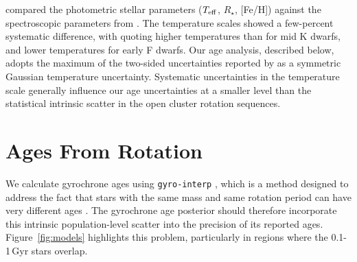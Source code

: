\documentclass[11pt,twocolumn,tighten]{aastex63}
\begin{document}
\citet{David_2021} compared the photometric
 stellar parameters ($T_{\rm eff}$,
$R_\star$, [Fe/H]) against the spectroscopic parameters from
\citet{Fulton_2018}.  The temperature scales showed a few-percent
systematic difference, with  quoting higher
temperatures than  for mid K dwarfs,
and lower temperatures for early F dwarfs.  Our age analysis,
described below, adopts the maximum of the two-sided
uncertainties reported by  as a
symmetric Gaussian temperature uncertainty.  Systematic
uncertainties in the temperature scale generally influence 
our age uncertainties at a
smaller level than the statistical intrinsic scatter in the
open cluster rotation sequences.


\section{Ages From Rotation}
\label{sec:rotage}

\begin{figure*}[!t]
	\begin{center}
		\leavevmode
	\end{center}
	\vspace{-0.6cm}
	\caption{
		{\bf The models.}
    Points represent $10^4$ draws from models that have been fitted to
    rotation periods \citep{Bouma_2023} and lithium equivalent widths
    \citep[EWs;][]{Jeffries_2023} of stars in open clusters.  Lines
    are the ``mean models'' at various ages.  The intrinsic dispersion
    in rotation and lithium about these mean models, which is what the
    models fit, sets the theoretical precision floor for the
    age-dating methods.    Additional sources of uncertainty,
    including measurement uncertainty, impose further limits on
    achievable precision.  These models are calibrated using open
    clusters younger than 4\,Gyr.  The displayed points assume a
    uniform distribution in temperature for visual clarity.  The sizes
    of the points are the same in each panel, so that low apparent
    density signifies greater dispersion around the mean.
		\label{fig:models}
	}
\end{figure*}

We calculate gyrochrone ages using \texttt{gyro-interp}
\citep{Bouma_2023}, which is a method designed to address the fact
that stars with the same mass and same rotation period can have very
different ages \citep[e.g.][]{Curtis_2019_ngc6811}.  The gyrochrone
age posterior should therefore incorporate this intrinsic
population-level scatter into the precision of its reported
ages.  Figure~\ref{fig:models} highlights this problem,
particularly in regions where the 0.1-1\,Gyr stars overlap.
\end{document}
